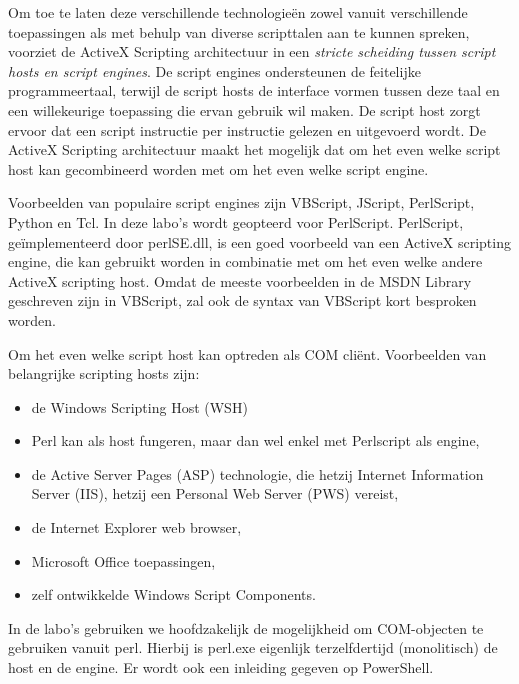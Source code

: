 \documentclass[11pt,a4paper]{report}
\begin{document}
Om toe te laten deze verschillende technologieën zowel vanuit verschillende toepassingen als met behulp van diverse scripttalen aan te kunnen spreken, voorziet de ActiveX Scripting architectuur in een \textit{stricte scheiding tussen script hosts en script engines}. De script engines ondersteunen de feitelijke programmeertaal, terwijl de script hosts de interface vormen tussen deze taal en een willekeurige toepassing die ervan gebruik wil maken. De script host zorgt ervoor dat een script instructie per instructie gelezen en uitgevoerd wordt. De ActiveX Scripting architectuur maakt het mogelijk dat om het even welke script host kan gecombineerd worden met om het even welke script engine.
\par Voorbeelden van populaire script engines zijn VBScript, JScript, PerlScript, Python en Tcl. In deze labo's wordt geopteerd voor PerlScript. PerlScript, geïmplementeerd door perlSE.dll, is een goed voorbeeld van een ActiveX scripting engine, die kan gebruikt worden in combinatie met om het even welke andere ActiveX scripting host. Omdat de meeste voorbeelden in de MSDN Library geschreven zijn in VBScript, zal ook de syntax van VBScript kort besproken worden.

Om het even welke script host kan optreden als COM cliënt. Voorbeelden van belangrijke scripting hosts zijn:
\begin{itemize}
\item de Windows Scripting Host (WSH)
\item Perl kan als host fungeren, maar dan wel enkel met Perlscript als engine,
\item de Active Server Pages (ASP) technologie, die hetzij Internet Information Server (IIS), hetzij een Personal Web Server (PWS) vereist, 
\item de Internet Explorer web browser,
\item Microsoft Office toepassingen,
\item zelf ontwikkelde Windows Script Components.
\end{itemize}
In de labo's gebruiken we hoofdzakelijk de mogelijkheid om COM-objecten te gebruiken vanuit perl. Hierbij is perl.exe eigenlijk terzelfdertijd (monolitisch) de host en de engine. 
Er wordt ook een inleiding gegeven op PowerShell.
\end{document}
